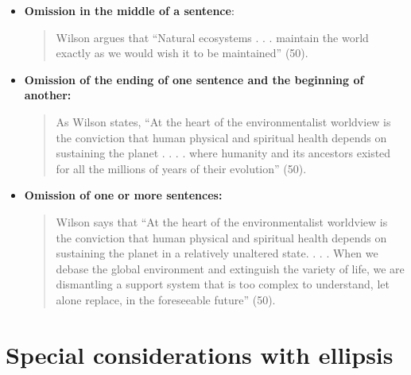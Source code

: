 \begin{itemize}

\item \textbf{Omission in the middle of a sentence}: \begin{quote}Wilson argues
that “Natural ecosystems . . . maintain the world exactly as we would wish it to
be maintained” (50).\end{quote}


\item \textbf{Omission of the ending of one sentence and the beginning of
another:} \begin{quote}As Wilson states, “At the heart of the environmentalist
worldview is the conviction that human physical and spiritual health depends on
sustaining the planet . . . . where humanity and its ancestors existed for all
the millions of years of their evolution” (50).\end{quote}

\item \textbf{Omission of one or more sentences:}\begin{quote} Wilson says that
“At the heart of the environmentalist worldview is the conviction that human
physical and spiritual health depends on sustaining the planet in a relatively
unaltered state. . . . When we debase the global environment and extinguish the
variety of life, we are dismantling a support system that is too complex to
understand, let alone replace, in the foreseeable future” (50).\end{quote}

\end{itemize}

\section*{Special considerations with ellipsis}

